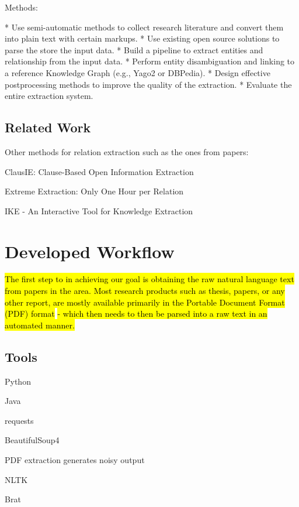 \documentclass[11pt,a4paper,openright]{memoir}
\begin{document}
Methods:

* Use semi-automatic methods to collect research literature and convert them into plain text with certain markups. 
* Use existing open source solutions to parse the store the input data. 
* Build a pipeline to extract entities and relationship from the input data. 
* Perform entity disambiguation and linking to a reference Knowledge Graph (e.g., Yago2 or DBPedia). 
* Design effective postprocessing methods to improve the quality of the extraction.
* Evaluate the entire extraction system.


%
%
%
%


\section{Related Work}

Other methods for relation extraction such as the ones from papers:

ClausIE: Clause-Based Open Information Extraction

Extreme Extraction: Only One Hour per Relation

IKE - An Interactive Tool for Knowledge Extraction


%
%
%
%


\chapter{Developed Workflow}

\hl{The first step to in achieving our goal is obtaining the raw natural language text from papers in the area. Most research products such as thesis, papers, or any other report, are mostly available primarily in the Portable Document Format (PDF) format} \cite{pdf} \hl{- which then needs to then be parsed into a raw text in an automated manner.}


%
%
%
%


\section{Tools}

Python

Java

requests

BeautifulSoup4

PDF extraction generates noisy output

NLTK

Brat
\end{document}
